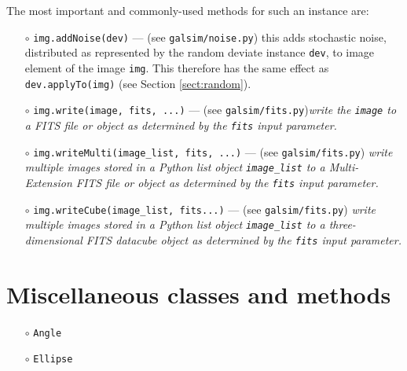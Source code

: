 \documentclass[preprint,11pt]{aastex}
\begin{document}
The most important and commonly-used methods for such an
instance are:
\begin{itemize}

\item[$\circ$] \texttt{img.addNoise(dev)} --- (see
  \texttt{galsim/noise.py}) this adds stochastic noise, distributed as
  represented by the random deviate instance \texttt{dev}, to image
  element of the image \texttt{img}.  This therefore has the same
  effect as \texttt{dev.applyTo(img)} (see Section \ref{sect:random}).

\item[$\circ$] \texttt{img.write(image, fits, ...)}  ---  (see
  \texttt{galsim/fits.py})\emph{write the \texttt{image} to a FITS
    file or object as determined by the \texttt{fits} input parameter.}

\item[$\circ$] \texttt{img.writeMulti(image\_list, fits, ...)} ---   (see
  \texttt{galsim/fits.py}) \emph{write multiple images stored in a
  Python list object \texttt{image\_list} to a Multi-Extension FITS
  file or object as determined by the \texttt{fits} input parameter.}

\item[$\circ$] \texttt{img.writeCube(image\_list, fits...)} ---   (see
  \texttt{galsim/fits.py}) \emph{write multiple images stored in a
  Python list object \texttt{image\_list} to a three-dimensional FITS
  datacube object as determined by the \texttt{fits} input parameter.}

\end{itemize}

\section{Miscellaneous classes and methods}\label{sect:misc}

\begin{itemize}

\item[$\circ$] \texttt{Angle}

\item[$\circ$] \texttt{Ellipse}

\end{itemize}
\end{document}
